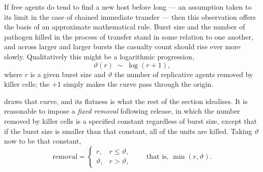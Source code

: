 If free agents do tend to find a new host before long --- an assumption
taken to its limit in the case of chained immediate transfer --- then this
observation offers the basis of an approximate mathematical rule. Burst size
and the number of pathogen killed in the process of transfer stand in some
relation to one another, and across larger and larger bursts the casualty
count should rise ever more slowly.
Qualitatively this might be a logarithmic progression,
\begin{equation}
\vartheta(r)\;\sim\;\log(r+1),
\label{path:eq:logremoval}
\end{equation}
where $r$ is a given burst size and $\vartheta$ the number of replicative
agents removed by killer cells; the $+1$ simply makes the curve pass
through the origin.

 draws that curve, and its flatness is what the
rest of the section idealises. It is reasonable to impose a \emph{fixed
removal} following release, in which the number removed by killer cells is a
specified constant regardless of burst size, except that if the burst size
is smaller than that constant, all of the units are killed. Taking
$\vartheta$ now to be that constant,
\begin{equation}
\text{removal} =
\begin{cases}
r, & r\le\vartheta,\\
\vartheta, & r>\vartheta,
\end{cases}
\qquad\text{that is, } \min(r,\vartheta).
\label{path:eq:fixedremoval}
\end{equation}

